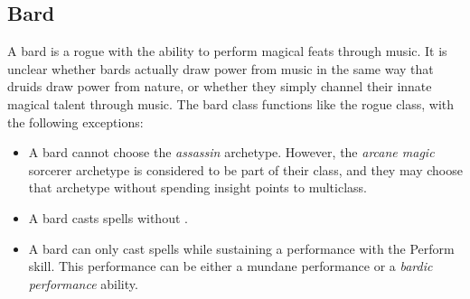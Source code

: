   \subsection{Bard}
    A bard is a rogue with the ability to perform magical feats through music.
    It is unclear whether bards actually draw power from music in the same way that druids draw power from nature, or whether they simply channel their innate magical talent through music.
    The bard class functions like the rogue class, with the following exceptions:
    \begin{itemize}
      \item A bard cannot choose the \textit{assassin} archetype. However, the \textit{arcane magic} sorcerer archetype is considered to be part of their class, and they may choose that archetype without spending insight points to multiclass.
      \item A bard casts spells without .
      \item A bard can only cast spells while sustaining a performance with the Perform skill. This performance can be either a mundane performance or a \textit{bardic performance} ability.
    \end{itemize}

